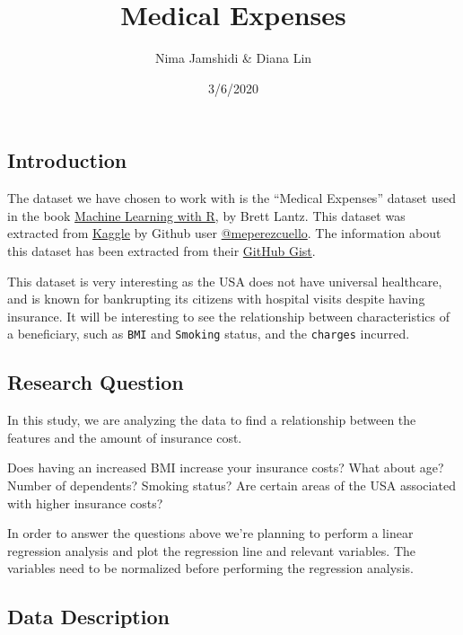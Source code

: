\documentclass[
]{article}
\title{Medical Expenses}
\author{Nima Jamshidi \& Diana Lin}
\date{3/6/2020}
\begin{document}
\maketitle

{
\setcounter{tocdepth}{2}
\tableofcontents
}
\hypertarget{introduction}{%
\subsection{Introduction}\label{introduction}}

The dataset we have chosen to work with is the ``Medical Expenses''
dataset used in the book
\href{https://www.amazon.com/Machine-Learning-R-Brett-Lantz/dp/1782162143}{Machine
Learning with R}, by Brett Lantz. This dataset was extracted from
\href{https://www.kaggle.com/mirichoi0218/insurance/home}{Kaggle} by
Github user
\href{https://gist.github.com/meperezcuello}{@meperezcuello}. The
information about this dataset has been extracted from their
\href{https://gist.github.com/meperezcuello/82a9f1c1c473d6585e750ad2e3c05a41}{GitHub
Gist}.

This dataset is very interesting as the USA does not have universal
healthcare, and is known for bankrupting its citizens with hospital
visits despite having insurance. It will be interesting to see the
relationship between characteristics of a beneficiary, such as
\texttt{BMI} and \texttt{Smoking} status, and the \texttt{charges}
incurred.

\hypertarget{research-question}{%
\subsection{Research Question}\label{research-question}}

In this study, we are analyzing the data to find a relationship between
the features and the amount of insurance cost.

Does having an increased BMI increase your insurance costs? What about
age? Number of dependents? Smoking status? Are certain areas of the USA
associated with higher insurance costs?

In order to answer the questions above we're planning to perform a
linear regression analysis and plot the regression line and relevant
variables. The variables need to be normalized before performing the
regression analysis.

\hypertarget{data-description}{%
\subsection{Data Description}\label{data-description}}
\end{document}
